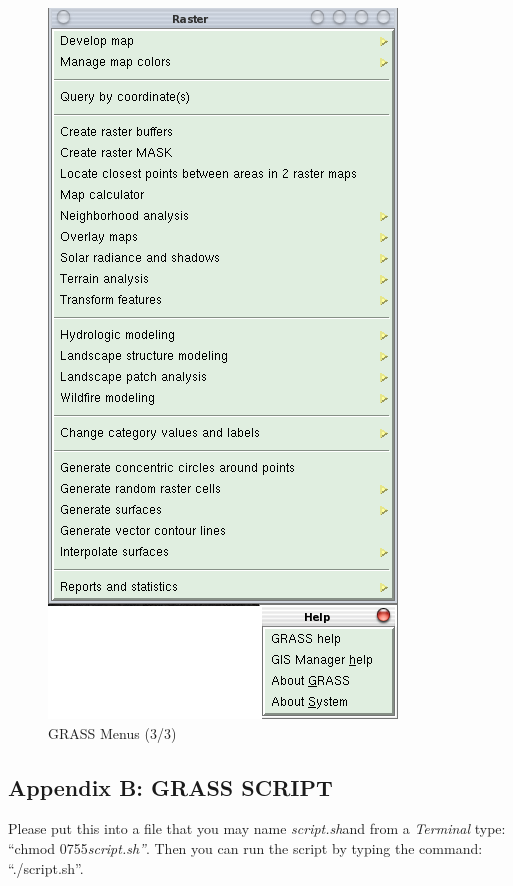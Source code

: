 \begin{figure}[htbp]
   \centering
   \includegraphics[scale=0.4]{grass027.png}
   \caption{GRASS Menus (3/3)}
   \label{fig:grass027}
\end{figure}

\newpage

\subsection{Appendix B: GRASS SCRIPT}
\label{appendixB}

Please put this into a file that you may name \textit{script.sh}\textup{and from a }\textit{Terminal}\textup{ type: ``chmod 0755}\textit{script.sh''}\textup{. Then you can run the script }by typing the command: ``./script.sh''.

